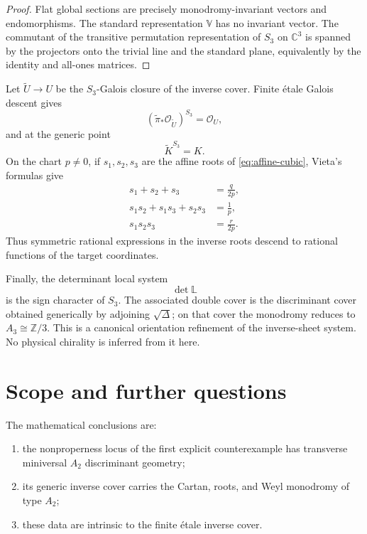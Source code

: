 \documentclass[11pt,reqno]{amsart}
\numberwithin{equation}{section}
\theoremstyle{remark}
\newcommand{\C}{\mathbb C}
\newcommand{\OO}{\mathcal O}
\begin{document}
\begin{proof}
Flat global sections are precisely monodromy-invariant vectors and endomorphisms. The standard representation $\mathbb V$ has no invariant vector. The commutant of the transitive permutation representation of $S_3$ on $\C^3$ is spanned by the projectors onto the trivial line and the standard plane, equivalently by the identity and all-ones matrices.
\end{proof}

Let $\widetilde U\to U$ be the $S_3$-Galois closure of the inverse cover. Finite étale Galois descent gives
\begin{equation}\label{eq:descent}
(\widetilde\pi_*\OO_{\widetilde U})^{S_3}=\OO_U,
\end{equation}
and at the generic point
\[
\widetilde K^{S_3}=K.
\]
On the chart $p\neq0$, if $s_1,s_2,s_3$ are the affine roots of \eqref{eq:affine-cubic}, Vieta's formulas give
\begin{equation}\label{eq:vieta}
\begin{aligned}
s_1+s_2+s_3&=\frac{q}{2p},\\
s_1s_2+s_1s_3+s_2s_3&=\frac1p,\\
s_1s_2s_3&=\frac{r}{2p}.
\end{aligned}
\end{equation}
Thus symmetric rational expressions in the inverse roots descend to rational functions of the target coordinates.

Finally, the determinant local system
\[
\det\mathbb L
\]
is the sign character of $S_3$. The associated double cover is the discriminant cover obtained generically by adjoining $\sqrt\Delta$; on that cover the monodromy reduces to $A_3\cong\mathbb Z/3$. This is a canonical orientation refinement of the inverse-sheet system. No physical chirality is inferred from it here.

\section{Scope and further questions}

The mathematical conclusions are:
\begin{enumerate}[label=\textup{(\roman*)}]
\item the nonproperness locus of the first explicit counterexample has transverse miniversal $A_2$ discriminant geometry;
\item its generic inverse cover carries the Cartan, roots, and Weyl monodromy of type $A_2$;
\item these data are intrinsic to the finite étale inverse cover.
\end{enumerate}
\end{document}
